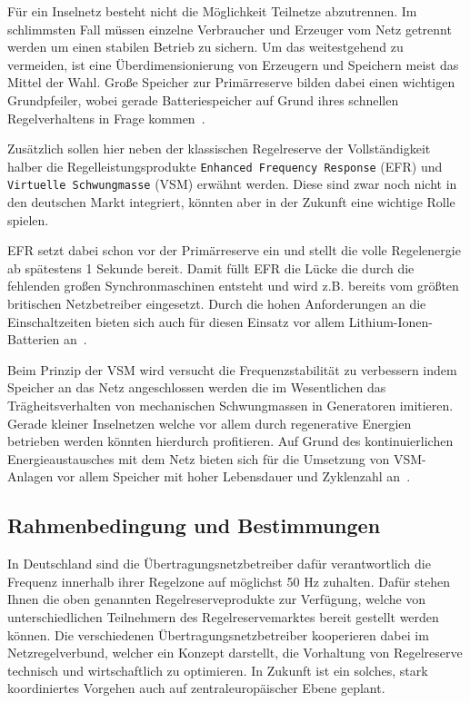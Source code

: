 Für ein Inselnetz besteht nicht die Möglichkeit Teilnetze abzutrennen. 
Im schlimmsten Fall müssen einzelne Verbraucher und Erzeuger vom Netz getrennt werden um einen stabilen Betrieb zu sichern.
Um das weitestgehend zu vermeiden, ist eine Überdimensionierung von Erzeugern und Speichern meist das Mittel der Wahl.
Große Speicher zur Primärreserve bilden dabei einen wichtigen Grundpfeiler, wobei gerade Batteriespeicher 
auf Grund ihres schnellen Regelverhaltens in Frage kommen~\parencite{Itschner}.

Zusätzlich sollen hier neben der klassischen Regelreserve der Vollständigkeit halber die Regelleistungsprodukte \texttt{Enhanced Frequency Response}
(EFR) und \texttt{Virtuelle Schwungmasse} (VSM) erwähnt werden.
Diese sind zwar noch nicht in den deutschen Markt integriert, könnten aber in der Zukunft eine wichtige Rolle spielen.

EFR setzt dabei schon vor der Primärreserve ein und stellt die volle Regelenergie ab spätestens 1 Sekunde bereit.
Damit füllt EFR die Lücke die durch die fehlenden großen Synchronmaschinen entsteht und wird z.B. bereits vom 
größten britischen Netzbetreiber eingesetzt.
Durch die hohen Anforderungen an die Einschaltzeiten bieten sich auch für diesen Einsatz vor allem
Lithium-Ionen-Batterien an~\parencite{mantar_gundogdu_battery_2018}.

Beim Prinzip der VSM wird versucht die Frequenzstabilität zu verbessern indem Speicher an das Netz angeschlossen werden
die im Wesentlichen das Trägheitsverhalten von mechanischen Schwungmassen in Generatoren imitieren.
Gerade kleiner Inselnetzen welche vor allem durch regenerative Energien betrieben werden könnten hierdurch profitieren.
Auf Grund des kontinuierlichen Energieaustausches mit dem Netz bieten sich für die Umsetzung von VSM-Anlagen vor allem
Speicher mit hoher Lebensdauer und Zyklenzahl an~\parencite{boxleitner_virtuelle_2009}.

\subsection{Rahmenbedingung und Bestimmungen}

In Deutschland sind die Übertragungsnetzbetreiber dafür verantwortlich die Frequenz innerhalb ihrer Regelzone auf möglichst
50 Hz zuhalten.
Dafür stehen Ihnen die oben genannten Regelreserveprodukte zur Verfügung, welche von unterschiedlichen Teilnehmern
des Regelreservemarktes bereit gestellt werden können.
Die verschiedenen Übertragungsnetzbetreiber kooperieren dabei im Netzregelverbund, welcher ein Konzept darstellt,
die Vorhaltung von Regelreserve technisch und wirtschaftlich zu optimieren.
In Zukunft ist ein solches, stark koordiniertes Vorgehen auch auf zentraleuropäischer Ebene geplant.

